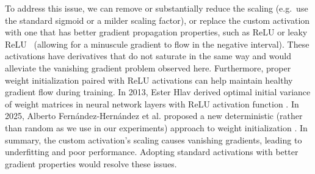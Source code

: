 {{To address this issue, we can remove or substantially reduce the scaling (e.g.\ use the standard sigmoid or a milder scaling factor), or replace the custom activation with one that has better gradient propagation properties, such as ReLU or leaky ReLU~\cite{Goodfellow-et-al-2016} (allowing for a minuscule gradient to flow in the negative interval). These activations have derivatives that do not saturate in the same way and would alleviate the vanishing gradient problem observed here. Furthermore, proper weight initialization paired with ReLU activations can help maintain healthy gradient flow during training. In 2013, Ester Hlav derived optimal initial variance of weight matrices in neural network layers with ReLU activation function \cite{kaiming_he_initialization_2023_w_init_relu}. In 2025, Alberto Fernández-Hernández et al. proposed a new deterministic (rather than random as we use in our experiments) approach to weight initialization \cite{fernándezhernández2025sinusoidalinitializationtimenew}. In summary, the custom activation's scaling causes vanishing gradients, leading to underfitting and poor performance. Adopting standard activations with better gradient properties would resolve these issues.}
}




